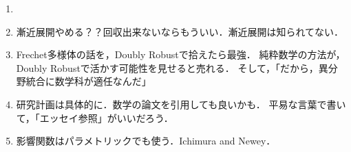 \documentclass[uplatex, dvipdfmx]{jsarticle}
\begin{document}
\begin{enumerate}
    \item 
    \item 漸近展開やめる？？回収出来ないならもういい．漸近展開は知られてない．
    \item Frechet多様体の話を，Doubly Robustで拾えたら最強．
    純粋数学の方法が，Doubly Robustで活かす可能性を見せると売れる．
    そして，「だから，異分野統合に数学科が適任なんだ」
    \item 研究計画は具体的に．数学の論文を引用しても良いかも．
    平易な言葉で書いて，「エッセイ参照」がいいだろう．
    \item 影響関数はパラメトリックでも使う．Ichimura and Newey．
\end{enumerate}
\end{document}
